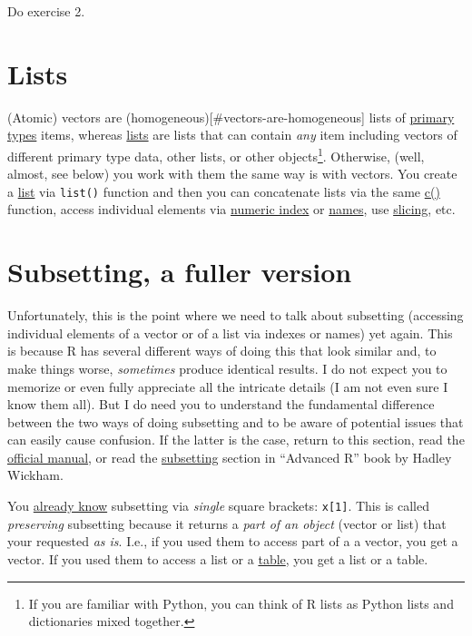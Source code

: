 \documentclass[
]{book}
\begin{document}
Do exercise 2.

\hypertarget{lists}{%
\section{Lists}\label{lists}}

(Atomic) vectors are (homogeneous){[}\#vectors-are-homogeneous{]} lists of \protect\hyperlink{primary-types}{primary types} items, whereas \href{https://stat.ethz.ch/R-manual/R-devel/library/base/html/list.html}{lists} are lists that can contain \emph{any} item including vectors of different primary type data, other lists, or other objects\footnote{If you are familiar with Python, you can think of R lists as Python lists and dictionaries mixed together.}. Otherwise, (well, almost, see below) you work with them the same way is with vectors. You create a \href{https://stat.ethz.ch/R-manual/R-devel/library/base/html/list.html}{list} via \texttt{list()} function and then you can concatenate lists via the same \href{(https://stat.ethz.ch/R-manual/R-devel/library/base/html/c.html)}{c()} function, access individual elements via \protect\hyperlink{vector-index}{numeric index} or \protect\hyperlink{names}{names}, use \protect\hyperlink{vector-index-slicing}{slicing}, etc.

\hypertarget{subsetting}{%
\section{Subsetting, a fuller version}\label{subsetting}}

Unfortunately, this is the point where we need to talk about subsetting (accessing individual elements of a vector or of a list via indexes or names) yet again. This is because R has several different ways of doing this that look similar and, to make things worse, \emph{sometimes} produce identical results. I do not expect you to memorize or even fully appreciate all the intricate details (I am not even sure I know them all). But I do need you to understand the fundamental difference between the two ways of doing subsetting and to be aware of potential issues that can easily cause confusion. If the latter is the case, return to this section, read the \href{https://stat.ethz.ch/R-manual/R-devel/library/base/html/Extract.html}{official manual}, or read the \href{http://adv-r.had.co.nz/Subsetting.html}{subsetting} section in ``Advanced R'' book by Hadley Wickham.

You \protect\hyperlink{vector-index}{already know} subsetting via \emph{single} square brackets: \texttt{x{[}1{]}}. This is called \emph{preserving} subsetting because it returns a \emph{part of an object} (vector or list) that your requested \emph{as is}. I.e., if you used them to access part of a a vector, you get a vector. If you used them to access a list or a \protect\hyperlink{data.frame}{table}, you get a list or a table.
\end{document}
